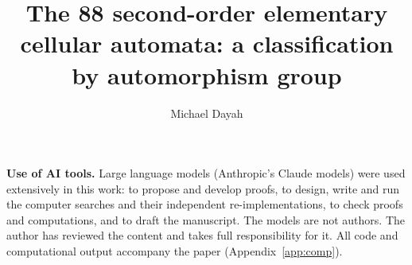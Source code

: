 \documentclass[11pt]{amsart}
\title[The 88 second-order elementary cellular automata]{The 88 second-order elementary cellular automata: a classification by automorphism group}
\author{Michael Dayah}
\theoremstyle{definition}
\theoremstyle{remark}
\begin{document}


\maketitle








\appendix


\medskip
\noindent\textbf{Use of AI tools.} Large language models (Anthropic's Claude models) were used extensively in this work: to propose and develop proofs, to design, write and run the computer searches and their independent re-implementations, to check proofs and computations, and to draft the manuscript. The models are not authors. The author has reviewed the content and takes full responsibility for it. All code and computational output accompany the paper (Appendix~\ref{app:comp}).


\end{document}
